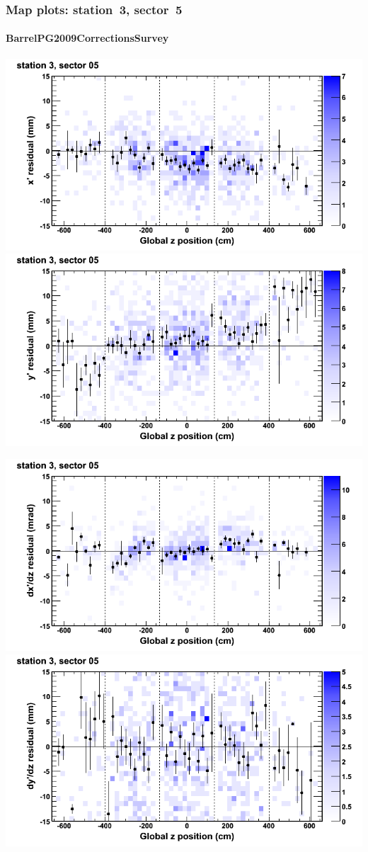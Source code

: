\documentclass[compress]{beamer}
\begin{document}
\begin{frame}
\frametitle{Map plots: station~3, sector~5}
\framesubtitle{BarrelPG2009CorrectionsSurvey}
\includegraphics[width=0.5\linewidth]{mapplots_01/DTvsz_st3sec05_x.png}
\includegraphics[width=0.5\linewidth]{mapplots_01/DTvsz_st3sec05_y.png}

\includegraphics[width=0.5\linewidth]{mapplots_01/DTvsz_st3sec05_dxdz.png}
\includegraphics[width=0.5\linewidth]{mapplots_01/DTvsz_st3sec05_dydz.png}
\end{frame}
\end{document}
